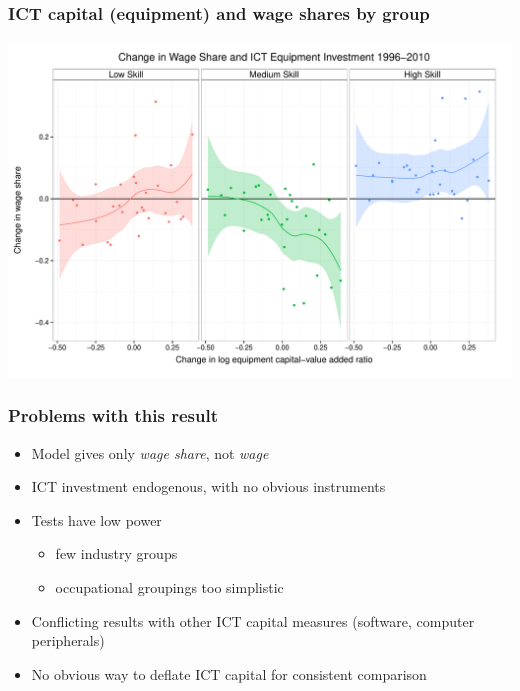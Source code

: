 \documentclass[red]{beamer}
\newcommand{\vitem}{\vfill\item}
\begin{document}
\begin{frame}[c]
  \frametitle{ICT capital (equipment) and wage shares by group}
\begin{center}
\includegraphics[width=\textwidth]{slides_fig/wage_share_equipment_skill.pdf}
\end{center}
\end{frame}

\begin{frame}[c]
  \frametitle{Problems with this result}
  \begin{itemize}
    \vitem Model gives only {\em wage share}, not {\em wage}
    \vitem ICT investment endogenous, with no obvious instruments
    \vitem Tests have low power
    \begin{itemize}
      \item few industry groups
      \item occupational groupings too simplistic
    \end{itemize}
    \vitem Conflicting results with other ICT capital measures 
           (software, computer peripherals)
    \vitem No obvious way to deflate ICT capital for consistent comparison
  \end{itemize}
\end{frame}
\end{document}
